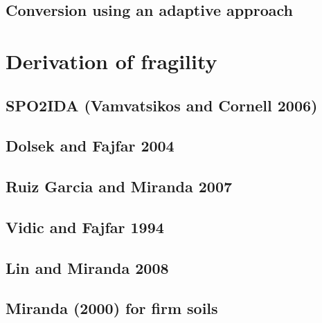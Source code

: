 		\subsection{Conversion using an adaptive approach}
		\label{subsec:adaptive}
		
		
	\section{Derivation of fragility}
	\label{sec:derivation_fragility}
	
			
		\subsection{SPO2IDA (Vamvatsikos and Cornell 2006)}
		\label{subsec:SPO2IDA}
		
		
		\subsection{Dolsek and Fajfar 2004}
		\label{subsec:DolsekFajfar}
		

		\subsection{Ruiz Garcia and Miranda 2007}
		\label{subsec:RuizGarciaMiranda}
		
		
		\subsection{Vidic and Fajfar 1994}
		\label{subsec: VidicFajfar1994}
		
		
		\subsection{Lin and Miranda 2008}
		\label{subsec:LinMiranda}
		
	
		\subsection{Miranda (2000) for firm soils}
		\label{subsec:Miranda}
		
		
